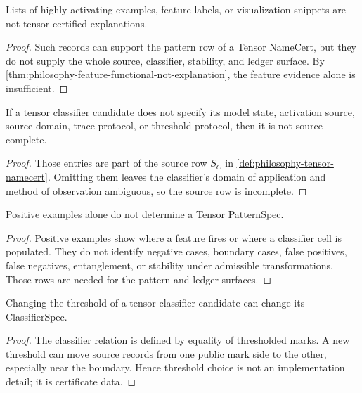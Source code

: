 \begin{corollary}
\label{cor:philosophy-top-activations-not-explanations}
Lists of highly activating examples, feature labels, or visualization
snippets are not tensor-certified explanations.
\end{corollary}
\begin{proof}
Such records can support the pattern row of a Tensor NameCert, but they
do not supply the whole source, classifier, stability, and ledger
surface. By \autoref{thm:philosophy-feature-functional-not-explanation},
the feature evidence alone is insufficient.
\end{proof}

\begin{theorem}
\label{thm:philosophy-source-ambiguity-blocks-tensor-certification}
If a tensor classifier candidate does not specify its model state,
activation source, source domain, trace protocol, or threshold protocol,
then it is not source-complete.
\end{theorem}
\begin{proof}
Those entries are part of the source row $S_C$ in
\autoref{def:philosophy-tensor-namecert}. Omitting them leaves the
classifier's domain of application and method of observation ambiguous,
so the source row is incomplete.
\end{proof}

\begin{theorem}
\label{thm:philosophy-pattern-evidence-needs-boundary-evidence}
Positive examples alone do not determine a Tensor PatternSpec.
\end{theorem}
\begin{proof}
Positive examples show where a feature fires or where a classifier cell
is populated. They do not identify negative cases, boundary cases, false
positives, false negatives, entanglement, or stability under admissible
transformations. Those rows are needed for the pattern and ledger
surfaces.
\end{proof}

\begin{theorem}
\label{thm:philosophy-threshold-selection-certificate-data}
Changing the threshold of a tensor classifier candidate can change its
ClassifierSpec.
\end{theorem}
\begin{proof}
The classifier relation is defined by equality of thresholded marks. A
new threshold can move source records from one public mark side to the
other, especially near the boundary. Hence threshold choice is not an
implementation detail; it is certificate data.
\end{proof}


